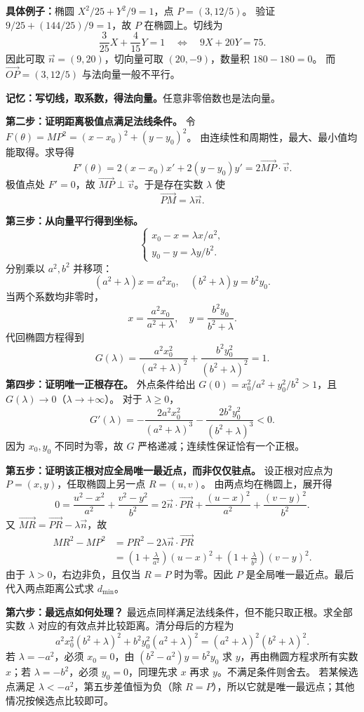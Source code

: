 \begin{proofbox}
\textbf{具体例子：}椭圆 $X^2/25+Y^2/9=1$，点 $P=(3,12/5)$。
验证 $9/25+(144/25)/9=1$，故 $P$ 在椭圆上。切线为
\[
\frac{3}{25}X+\frac{4}{15}Y=1\quad\Longleftrightarrow\quad 9X+20Y=75.
\]
因此可取 $\vec n=(9,20)$，切向量可取 $(20,-9)$，数量积 $180-180=0$。
而 $\overrightarrow{OP}=(3,12/5)$ 与法向量一般不平行。

\textbf{记忆：写切线，取系数，得法向量。}任意非零倍数也是法向量。

\textbf{第二步：证明距离极值点满足法线条件。}
令 $F(\theta)=MP^2=(x-x_0)^2+(y-y_0)^2$。
由连续性和周期性，最大、最小值均能取得。求导得
\[
F'(\theta)=2(x-x_0)x'+2(y-y_0)y'
=2\overrightarrow{MP}\cdot\vec v.
\]
极值点处 $F'=0$，故 $\overrightarrow{MP}\perp\vec v$。于是存在实数 $\lambda$ 使
\[
\boxed{\overrightarrow{PM}=\lambda\vec n.}
\]


\textbf{第三步：从向量平行得到坐标。}
\[
\begin{cases}x_0-x=\lambda x/a^2,\\y_0-y=\lambda y/b^2.\end{cases}
\]
分别乘以 $a^2,b^2$ 并移项：
\[
(a^2+\lambda)x=a^2x_0,\quad (b^2+\lambda)y=b^2y_0.
\]
当两个系数均非零时，
\[
x=\frac{a^2x_0}{a^2+\lambda},\quad y=\frac{b^2y_0}{b^2+\lambda}.
\]
代回椭圆方程得到
\[
G(\lambda)=\frac{a^2x_0^2}{(a^2+\lambda)^2}+\frac{b^2y_0^2}{(b^2+\lambda)^2}=1.
\]
\textbf{第四步：证明唯一正根存在。}
外点条件给出 $G(0)=x_0^2/a^2+y_0^2/b^2>1$，且 $G(\lambda)\to0$（$\lambda\to+\infty$）。
对于 $\lambda\ge0$，
\[
G'(\lambda)=-\frac{2a^2x_0^2}{(a^2+\lambda)^3}-\frac{2b^2y_0^2}{(b^2+\lambda)^3}<0.
\]
因为 $x_0,y_0$ 不同时为零，故 $G$ 严格递减；连续性保证恰有一个正根。

\textbf{第五步：证明该正根对应全局唯一最近点，而非仅仅驻点。}
设正根对应点为 $P=(x,y)$，任取椭圆上另一点 $R=(u,v)$。
由两点均在椭圆上，展开得
\[
0=\frac{u^2-x^2}{a^2}+\frac{v^2-y^2}{b^2}
=2\vec n\cdot\overrightarrow{PR}+\frac{(u-x)^2}{a^2}+\frac{(v-y)^2}{b^2}.
\]
又 $\overrightarrow{MR}=\overrightarrow{PR}-\lambda\vec n$，故
\[
\begin{aligned}
MR^2-MP^2&=PR^2-2\lambda\vec n\cdot\overrightarrow{PR}\\
&=\left(1+\frac{\lambda}{a^2}\right)(u-x)^2
+\left(1+\frac{\lambda}{b^2}\right)(v-y)^2.
\end{aligned}
\]
由于 $\lambda>0$，右边非负，且仅当 $R=P$ 时为零。因此 $P$ 是全局唯一最近点。最后代入两点距离公式求 $d_{\min}$。

\textbf{第六步：最远点如何处理？}
最远点同样满足法线条件，但不能只取正根。求全部实数 $\lambda$ 对应的有效点并比较距离。清分母后的方程为
\[
a^2x_0^2(b^2+\lambda)^2+b^2y_0^2(a^2+\lambda)^2
=(a^2+\lambda)^2(b^2+\lambda)^2.
\]
若 $\lambda=-a^2$，必须 $x_0=0$，由 $(b^2-a^2)y=b^2y_0$ 求 $y$，再由椭圆方程求所有实数 $x$；若 $\lambda=-b^2$，必须 $y_0=0$，同理先求 $x$ 再求 $y$。不满足条件则舍去。
若某候选点满足 $\lambda<-a^2$，第五步差值恒为负（除 $R=P$），所以它就是唯一最远点；其他情况按候选点比较即可。
\end{proofbox}

